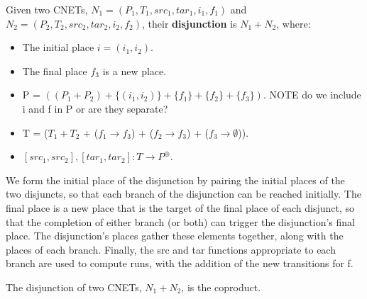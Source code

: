 \begin{definition}
  \label{def:OR-PN}
  Given two CNETs, $N_1= (P_1, T_1, src_1, tar_1, i_1, f_1)$ and $N_2= (P_2, T_2, src_2, tar_2, i_2, f_2)$, their \textbf{disjunction} is $N_1 + N_2$, where: 
\begin{itemize}
\item The initial place $i = (i_1 , i_2)$.
\item The final place $f_3$ is a new place.
\item P = $((P_1 + P_2) + \{(i_1 , i_2)\} + \{f_1\} + \{f_2\} + \{f_3\}).$ NOTE do we include i and f in P or are they separate?
\item T = ($T_1 + T_2$ + ($f_1 \to f_3$) + ($f_2 \to f_3$) + ($f_3 \to \emptyset$)).
\item $[src_1, src_2], [tar_1, tar_2]: T\to P^\oplus$. 
\end{itemize}
We form the initial place of the disjunction by pairing the initial places of the two disjuncts, so that each branch of the disjunction can be reached initially. The final place is a new place that is the target of the final place of each disjunct, so that the completion of either branch (or both) can trigger the disjunction's final place. The disjunction's places gather these elements together, along with the places of each branch. Finally, the src and tar functions appropriate to each branch are used to compute runs, with the addition of the new transitions for f.  
\end{definition}
\begin{lemma}
  \label{lemma:OR-coproduct}
  The disjunction of two CNETs, $N_1 + N_2$, is the coproduct. 
\end{lemma}
